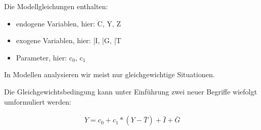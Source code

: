 \documentclass[11pt]{article}
\begin{document}
Die Modellgleichungen enthalten:
\begin{itemize}
\item endogene Variablen, hier: C, Y, Z
\item exogene Variablen, hier: \bar{I}, \bar{G}, \bar{T}
\item Parameter, hier: c\(_{\text{0}}\), c\(_{\text{1}}\)
\end{itemize}

In Modellen analysieren wir meist nur gleichgewichtige Situationen.

Die Gleichgewichtsbedingung kann unter Einführung zwei neuer Begriffe wiefolgt umformuliert werden:

\begin{equation*}
\begin{aligned}
Y = c_0 + c_1*(Y-\bar{T})+\bar{I}+\bar{G}
\end{aligned}
\end{equation*}
\end{document}
